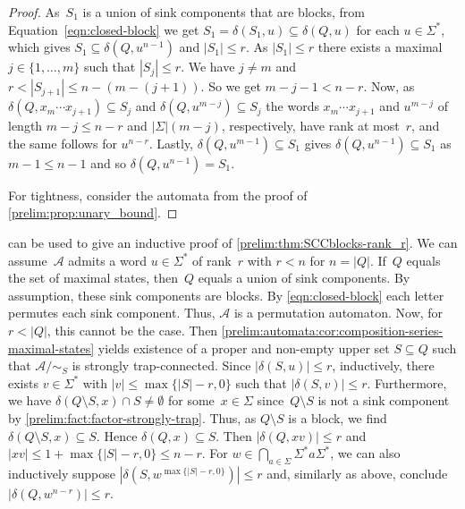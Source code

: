 \begin{proof}
	As~$S_1$ is a union of sink components that are blocks, 
	from Equation~\eqref{eqn:closed-block} we get $S_1 = \delta(S_1, u) \subseteq \delta(Q, u)$
	for each $u \in \Sigma^*$, which gives $S_1 \subseteq \delta(Q,u^{n-1})$  and $|S_1| \le r$.
	As $|S_1| \le r$ there exists a maximal $j \in \{1,\ldots,m\}$
	such that $|S_j| \le r$. 
	We have $j \ne m$
	and $r < |S_{j+1}| \le n - (m - (j+1))$.
	So we get $m - j - 1 < n - r$.
	Now, as $\delta(Q, x_m \cdots x_{j+1}) \subseteq S_j$
	and $\delta(Q, u^{m - j}) \subseteq S_{j}$
	the words $x_m \cdots x_{j+1}$ 
	and $u^{m - j}$
	of length $m - j \le n - r$ and $|\Sigma|(m-j)$, respectively,
	have rank at most~$r$,
	and the same follows for $u^{n- r}$.
	Lastly, $\delta(Q, u^{m - 1}) \subseteq S_1$
	gives $\delta(Q, u^{n - 1}) \subseteq S_1$ as $m - 1 \le n - 1$
	and so $\delta(Q, u^{n - 1}) = S_1$.
	
	For tightness, consider the automata from the proof of \cref{prelim:prop:unary_bound}.
\end{proof}

\begin{remark}
	can be used to give an inductive
	proof of \cref{prelim:thm:SCCblocks-rank_r}. 
	We can assume~$\mathcal A$ admits a word $u \in \Sigma^*$ of rank~$r$
	with $r < n$ for $n = |Q|$.
	If~$Q$ equals the set of maximal states,
	then~$Q$ equals a union of sink components.
	By assumption, these sink components are blocks.
	By \cref{eqn:closed-block} 
	each letter permutes each sink component.
	Thus, $\mathcal A$ is a permutation automaton.
	Now, for  $r < |Q|$, this cannot be the case.
	Then \cref{prelim:automata:cor:composition-series-maximal-states}
	yields existence of a proper and non-empty
	upper set $S \subseteq Q$
	such that $\mathcal A / {\sim_S}$
	is strongly trap-connected.
	Since $|\delta(S, u)| \le r$,
	inductively, there exists $v \in \Sigma^*$
	with $|v| \le \max\{ |S| - r, 0 \}$
	such that $|\delta(S, v)| \le r$.
	Furthermore, we have $\delta(Q \setminus S, x) \cap S \ne \emptyset$
	for some~$x \in \Sigma$ since~$Q \setminus S$ is not a sink component
	by \cref{prelim:fact:factor-strongly-trap}. 
	Thus, as $Q \setminus S$ is a block,
	we find $\delta(Q \setminus S, x) \subseteq S$.
	Hence $\delta(Q, x) \subseteq S$.
	Then $|\delta(Q, xv)| \le r$
	and $|xv| \le 1 + \max\{ |S| - r, 0 \} \le n - r$.
	For $w \in \bigcap_{a \in \Sigma} \Sigma^* a \Sigma^*$, we can also inductively
	suppose $|\delta(S, w^{\max\{|S|-r,0\}})| \le r$
	and, similarly as above, conclude
	$|\delta(Q, w^{n - r})| \le r$.
\end{remark}

